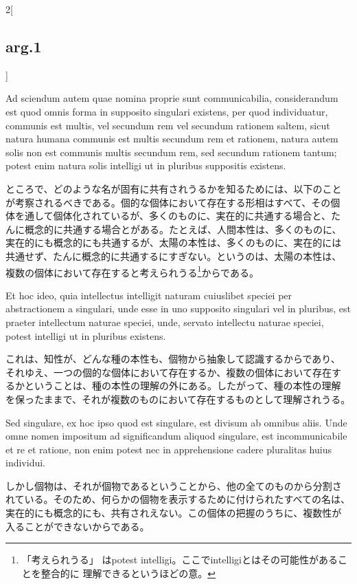 \documentclass[paper=a4paper,fontsize=10pt,jafontsize=9pt,titlepage]{jlreq}
\begin{document}
\begin{paracol}{2}[\subsection{arg.1}]
\switchcolumn*

Ad sciendum autem quae nomina proprie sunt communicabilia,
considerandum est quod omnis forma in supposito singulari existens,
per quod individuatur, communis est multis, vel secundum rem vel
secundum rationem saltem, sicut natura humana communis est multis
secundum rem et rationem, natura autem solis non est communis multis
secundum rem, sed secundum rationem tantum; potest enim natura solis
intelligi ut in pluribus suppositis existens.

\switchcolumn

ところで、どのような名が固有に共有されうるかを知るためには、以下のこと
が考察されるべきである。個的な個体において存在する形相はすべて、その個
体を通して個体化されているが、多くのものに、実在的に共通する場合と、た
んに概念的に共通する場合とがある。たとえば、人間本性は、多くのものに、
実在的にも概念的にも共通するが、太陽の本性は、多くのものに、実在的には
共通せず、たんに概念的に共通するにすぎない。というのは、太陽の本性は、
複数の個体において存在すると考えられうる\footnote{「考えられうる」
はpotest intelligi。ここでintelligiとはその可能性があることを整合的に
理解できるというほどの意。}からである。

\switchcolumn*

Et hoc ideo, quia intellectus intelligit naturam cuiuslibet speciei
per abstractionem a singulari, unde esse in uno supposito singulari
vel in pluribus, est praeter intellectum naturae speciei, unde,
servato intellectu naturae speciei, potest intelligi ut in pluribus
existens.

\switchcolumn

これは、知性が、どんな種の本性も、個物から抽象して認識するからであり、
それゆえ、一つの個的な個体において存在するか、複数の個体において存在す
るかということは、種の本性の理解の外にある。したがって、種の本性の理解
を保ったままで、それが複数のものにおいて存在するものとして理解されうる。

\switchcolumn*

Sed singulare, ex hoc ipso quod est singulare, est divisum ab omnibus
aliis. Unde omne nomen impositum ad significandum aliquod singulare,
est incommunicabile et re et ratione, non enim potest nec in
apprehensione cadere pluralitas huius individui.

\switchcolumn

しかし個物は、それが個物であるということから、他の全てのものから分割さ
れている。そのため、何らかの個物を表示するために付けられたすべての名は、
実在的にも概念的にも、共有されえない。この個体の把握のうちに、複数性が
入ることができないからである。


\end{paracol}
\end{document}
